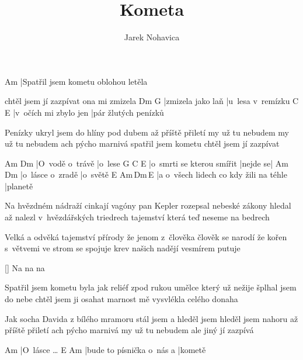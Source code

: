 \documentclass{song}
\title{Kometa}
\author{Jarek Nohavica}
\begin{document}
\strophe
Am
|Spatřil jsem kometu oblohou letěla

chtěl jsem jí zazpívat ona mi zmizela
Dm				  G\7
|zmizela jako laň |u~lesa v~remízku
C					  E\7
|v~očích mi zbylo jen |pár žlutých penízků
\endstrophe

\strophe*
Penízky ukryl jsem do hlíny pod dubem
až příště přiletí my už tu nebudem
my už tu nebudem ach pýcho marnivá
spatřil jsem kometu chtěl jsem jí zazpívat
\endstrophe

Am				Dm
|O~vodě o~trávě |o~lese
G\7						  C		   E\7
|o~smrti se kterou smířit |nejde se|
Am				 Dm
|o~lásce o~zradě |o~světě
E\7									   Am\,Dm\,E\7
|a o~všech lidech co kdy žili na téhle |planetě
\endstrophe

\strophe*
Na hvězdném nádraží cinkají vagóny
pan Kepler rozepsal nebeské zákony
hledal až nalezl v~hvězdářských triedrech
tajemství která teď neseme na bedrech
\endstrophe

\strophe*
Velká a odvěká tajemství přírody
že jenom z~člověka člověk se narodí
že kořen s~větvemi ve strom se spojuje
krev našich nadějí vesmírem putuje
\endstrophe

\ref{} Na na na

\strophe*
Spatřil jsem kometu byla jak reliéf
zpod rukou umělce který už nežije
šplhal jsem do nebe chtěl jsem ji osahat
marnost mě vysvlékla celého donaha
\endstrophe

\strophe*
Jak socha Davida z bílého mramoru
stál jsem a hleděl jsem hleděl jsem nahoru
až příště přiletí ach pýcho marnivá
my už tu nebudem ale jiný jí zazpívá
\endstrophe

Am
|O~lásce \ldots{}
E\7						  Am
|bude to písnička o~nás a |kometě
\endstrophe
\end{document}
